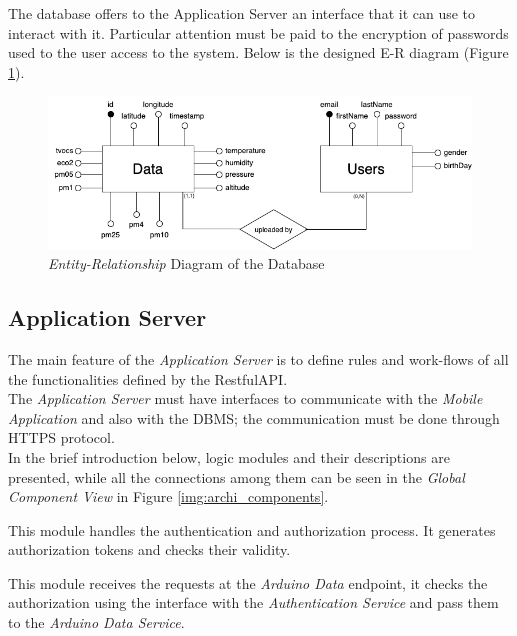 The database offers to the Application Server an interface that it can use to interact with it.
Particular attention must be paid to the encryption of passwords used to the user access to the system.
Below is the designed E-R diagram (Figure \ref{img:archi_er}).

\begin{figure}[H]
\begin{center}
  \includegraphics[width=\textwidth]{img/archi/ER.png}
  \hspace{0.05\linewidth}
  \centering
  \caption{\textit{Entity-Relationship} Diagram of the Database}
  \label{img:archi_er}
\end{center}
\end{figure}

\subsection{Application Server}
The main feature of the \textit{Application Server} is to define rules and work-flows of all the functionalities defined by the RestfulAPI.\\
The \textit{Application Server} must have interfaces to communicate with the \textit{Mobile Application} and also with the DBMS; the communication must be done through HTTPS protocol.\\
In the brief introduction below, logic modules and their descriptions are presented, while all the connections among them can be seen in the \textit{Global Component View} in Figure \ref{img:archi_components}.

This module handles the authentication and authorization process. It generates authorization tokens and checks their validity.

This module receives the requests at the \textit{Arduino Data} endpoint, it checks the authorization using the interface with the \textit{Authentication Service} and pass them to the \textit{Arduino Data Service}.


